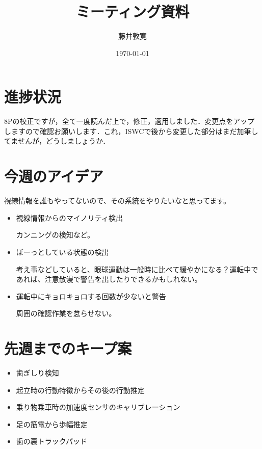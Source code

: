 \documentclass[a4j,twocolumn,10pt]{jarticle}
\title{ミーティング資料}
\author{藤井敦寛}
\date{\today}
\begin{document}
\maketitle

\section{進捗状況}
8Pの校正ですが，全て一度読んだ上で，修正，適用しました．変更点をアップしますので確認お願いします．これ，ISWCで後から変更した部分はまだ加筆してませんが，どうしましょうか．

\section{今週のアイデア}
視線情報を誰もやってないので、その系統をやりたいなと思ってます。
\begin{itemize}
  \item 視線情報からのマイノリティ検出

  カンニングの検知など。

  \item ぼーっとしている状態の検出

  考え事などしていると、眼球運動は一般時に比べて緩やかになる？運転中であれば、注意散漫で警告を出したりできるかもしれない。

  \item 運転中にキョロキョロする回数が少ないと警告

  周囲の確認作業を怠らせない。
\end{itemize}

\section{先週までのキープ案}
\begin{itemize}
  \item 歯ぎしり検知
  \item 起立時の行動特徴からその後の行動推定
  \item 乗り物乗車時の加速度センサのキャリブレーション
  \item 足の筋電から歩幅推定
  \item 歯の裏トラックパッド
\end{itemize}
\end{document}
